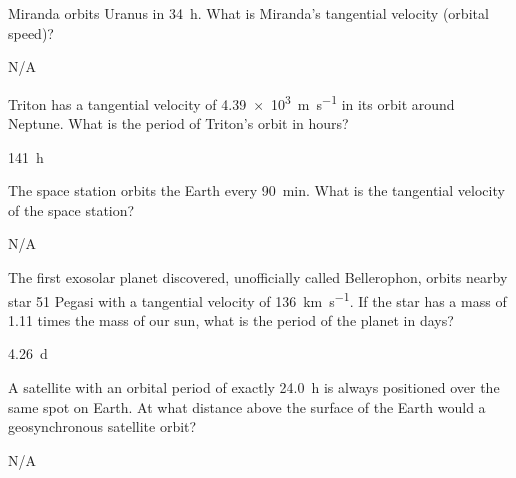 


\begin{question}[ID=gravity-A-Q01,topic=gravity,difficulty=A]
    Miranda orbits Uranus in \SI{34}{\hour}.
    What is Miranda's tangential velocity (orbital speed)?
\end{question}
\begin{solution}
    N/A
\end{solution}


\begin{question}[ID=gravity-A-Q01,topic=gravity,difficulty=A]
    Triton has a tangential velocity of \SI{4.39e3}{\meter\per\second}
        in its orbit around Neptune.
    What is the period of Triton's orbit in hours?
\end{question}
\begin{solution}
    \SI{141}{\hour}
\end{solution}


\begin{question}[ID=gravity-A-Q03,topic=gravity,difficulty=A]
    The space station orbits the Earth every \SI{90}{\minute}.
    What is the tangential velocity of the space station?
\end{question}
\begin{solution}
    N/A
\end{solution}


\begin{question}[ID=gravity-A-Q04,topic=gravity,difficulty=A]
    The first exosolar planet discovered, unofficially called Bellerophon,
        orbits nearby star 51 Pegasi with a tangential velocity
        of \SI{136}{\kilo\meter\per\second}.
    If the star has a mass of \num{1.11} times the mass of our sun,
        what is the period of the planet in days?
\end{question}
\begin{solution}
    \SI{4.26}{\day}
\end{solution}


\begin{question}[ID=gravity-B-Q01,topic=gravity,difficulty=B]
    A satellite with an orbital period of exactly
        \SI{24.0}{\hour} is always positioned over
        the same spot on Earth.
    At what distance above the surface of the Earth
        would a geosynchronous satellite orbit?
\end{question}
\begin{solution}
    N/A
\end{solution}


